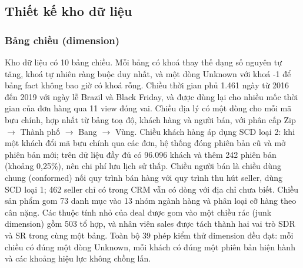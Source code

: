 \subsection{Thiết kế kho dữ liệu}
\subsubsection*{Bảng chiều (dimension)}
Kho dữ liệu có 10 bảng chiều. Mỗi bảng có khoá thay thế dạng số nguyên tự tăng, khoá tự nhiên ràng buộc duy nhất, và một dòng Unknown với khoá -1 để bảng fact không bao giờ có khoá rỗng. Chiều thời gian  phủ 1.461 ngày từ 2016 đến 2019 với ngày lễ Brazil và Black Friday, và được dùng lại cho nhiều mốc thời gian của đơn hàng qua 11 view đóng vai. Chiều địa lý  có một dòng cho mỗi mã bưu chính, hợp nhất từ bảng toạ độ, khách hàng và người bán, với phân cấp Zip $\rightarrow$ Thành phố $\rightarrow$ Bang $\rightarrow$ Vùng. Chiều khách hàng  áp dụng SCD loại 2: khi một khách đổi mã bưu chính qua các đơn, hệ thống đóng phiên bản cũ và mở phiên bản mới; trên dữ liệu đầy đủ có 96.096 khách và thêm 242 phiên bản (khoảng 0,25\%), nên chi phí lưu lịch sử thấp. Chiều người bán  là chiều dùng chung (conformed) nối quy trình bán hàng với quy trình thu hút seller, dùng SCD loại 1; 462 seller chỉ có trong CRM vẫn có dòng với địa chỉ chưa biết. Chiều sản phẩm gom 73 danh mục vào 13 nhóm ngành hàng và phân loại cỡ hàng theo cân nặng. Các thuộc tính nhỏ của deal được gom vào một chiều rác (junk dimension) gồm 503 tổ hợp, và nhân viên sales được tách thành hai vai trò SDR và SR trong cùng một bảng. Toàn bộ 39 phép kiểm thử dimension đều đạt: mỗi chiều có đúng một dòng Unknown, mỗi khách có đúng một phiên bản hiện hành và các khoảng hiệu lực không chồng lấn.


